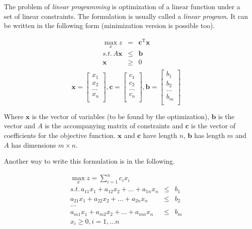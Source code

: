 The problem of \textit{linear programming} is optimization of a linear function under a set of linear constraints. The formulation is usually called a \textit{linear program}. It can be written in the following form (minimization version is possible too).

\begin{eqnarray*}
\max_{x} z & = & \mathbf{c}^{\mathrm{T}}\mathbf{x} \\
s.t.\, A\mathbf{x} & \leqslant & \mathbf{b} \\
\mathbf{x} & \geqslant & 0 \\
\end{eqnarray*}
\[
\mathbf{x} =
\begin{bmatrix}
x_1 \\
x_2 \\
\ldots \\
x_n \\
\end{bmatrix},
\mathbf{c} = 
\begin{bmatrix}
c_1 \\
c_2 \\
\ldots \\
c_n \\
\end{bmatrix},
\mathbf{b} =
\begin{bmatrix}
b_1 \\
b_2 \\
\ldots \\
b_m \\
\end{bmatrix}
\]

Where $\mathbf{x}$ is the vector of variables (to be found by the optimization), $\mathbf{b}$ is the vector and $A$ is the accompanying matrix of constraints and $\mathbf{c}$ is the vector of coefficients for the objective function. $\mathbf{x}$ and $\mathbf{c}$ have length $n$, $\mathbf{b}$ has length $m$ and $A$ has dimensions $m \times n$.

Another way to write this formulation is in the following.

\begin{eqnarray*}
\max_{x} z = \sum_{i=1}^{n} c_i x_i \\
s.t.\, a_{11}x_{1} + a_{12}x_{2} + \ldots + a_{1n}x_{n} & \leqslant & b_{1} \\
	   a_{21}x_{1} + a_{22}x_{2} + \ldots + a_{2n}x_{n} & \leqslant & b_{2} \\
	   \ldots \\
	   a_{m1}x_{1} + a_{m2}x_{2} + \ldots + a_{mn}x_{n} & \leqslant & b_{m} \\
	   x_i \geqslant 0, i = 1, \ldots n \\
\end{eqnarray*}

